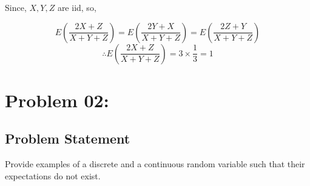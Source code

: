 \documentclass{article}
\theoremstyle{definition}
\begin{document}
Since, $X,Y, Z$ are iid, so,

\[
E\left( \frac{2X + Z}{X + Y + Z} \right) = E\left( \frac{2Y + X}{X + Y + Z} \right) = E\left( \frac{2Z + Y}{X + Y + Z} \right)
\]
\[
\therefore E\left( \frac{2X + Z}{X + Y + Z} \right) = 3 \times \frac{1}{3} = \boxed{1}
\]


\begin{comment}
    Due to the almost sure finiteness, we can now take the expectation:

\begin{align*}
E \left[ \frac{2X + Z}{X + Y + Z} \right] &= \int_{\Omega} \frac{2X(\omega) + Z(\omega)}{X(\omega) + Y(\omega) + Z(\omega)} dP(\omega) \\
&= \int_{\Omega} \frac{2(X(\omega) + \frac{Z(\omega)}{2})}{X(\omega) + Y(\omega) + Z(\omega)} dP(\omega) \\
&= \int_{\Omega} \frac{2 - 2 \cdot \frac{Z(\omega)}{2(X(\omega) + Y(\omega) + Z(\omega))}}{1} dP(\omega) \\
&= 2 - 2E \left[ \frac{Z(\omega)}{2(X(\omega) + Y(\omega) + Z(\omega))} \right] \tag{1}
\end{align*}

Since $X$, $Y$, and $Z$ are independent and identically distributed (i.i.d.), their expectations are equal:

$$E[X] = E[Y] = E[Z] = \mu$$

Substituting back into Equation (1):

\begin{align*}
E \left[ \frac{2X + Z}{X + Y + Z} \right] &= 2 - 2E \left[ \frac{Z(\omega)}{2(X(\omega) + Y(\omega) + Z(\omega))} \right] \\
&= 2 - 2E \left[ \frac{\mu}{2(3 \mu)} \right] \\
&= 2 - 2 \cdot \frac{\mu}{6 \mu} \\
&= \boxed{1}
\end{align*}

Therefore, we have shown that the expectation of $\frac{2X + Z}{X + Y + Z}$ exists and is equal to 1.
\end{comment}


\vspace{0.5cm}
\section{Problem 02:}
\begin{mdframed}[style = MyFrame]
\subsection{Problem Statement}
Provide examples of a discrete and a continuous random variable such that their expectations do not exist.

\end{mdframed}
\end{document}
